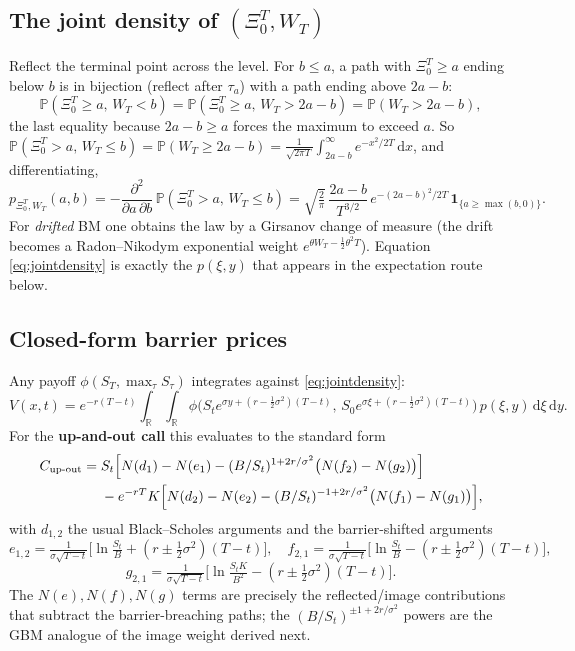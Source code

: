 \documentclass[11pt]{article}
\newcommand{\R}{\mathbb{R}}
\newcommand{\Prob}{\mathbb{P}}
\newcommand{\dd}{\,\mathrm{d}}
\newcommand{\Max}{\Xi}
\begin{document}
\subsection{The joint density of $(\Max_0^T,W_T)$}\label{sec:joint}
Reflect the terminal point across the level. For $b\le a$, a path with $\Max_0^T\ge a$ ending below $b$ is in
bijection (reflect after $\tau_a$) with a path ending above $2a-b$:
\begin{equation}
\Prob(\Max_0^T\ge a,\,W_T< b)=\Prob(\Max_0^T\ge a,\,W_T>2a-b)=\Prob(W_T>2a-b),
\end{equation}
the last equality because $2a-b\ge a$ forces the maximum to exceed $a$. So
$\Prob(\Max_0^T> a,\,W_T\le b)=\Prob(W_T\ge 2a-b)=\frac{1}{\sqrt{2\pi T}}\int_{2a-b}^{\infty}e^{-x^2/2T}\dd x$,
and differentiating,
\begin{equation}\label{eq:jointdensity}
p_{\Max_0^T,W_T}(a,b)=-\frac{\partial^2}{\partial a\,\partial b}\,\Prob(\Max_0^T>a,\,W_T\le b)
=\sqrt{\tfrac{2}{\pi}}\,\frac{2a-b}{T^{3/2}}\,e^{-(2a-b)^2/2T}\,\mathbf 1_{\{a\ge\max(b,0)\}}.
\end{equation}
For \emph{drifted} BM one obtains the law by a Girsanov change of measure (the drift becomes a Radon--Nikodym
exponential weight $e^{\theta W_T-\frac12\theta^2 T}$). Equation \eqref{eq:jointdensity} is exactly the
$p(\xi,y)$ that appears in the expectation route below.

\subsection{Closed-form barrier prices}
Any payoff $\phi(S_T,\max_{\tau}S_\tau)$ integrates against \eqref{eq:jointdensity}:
\begin{equation}
V(x,t)=e^{-r(T-t)}\!\int_{\R}\!\int_{\R}
\phi\big(S_t e^{\sigma y+(r-\frac12\sigma^2)(T-t)},\,S_0 e^{\sigma\xi+(r-\frac12\sigma^2)(T-t)}\big)\,
p(\xi,y)\dd\xi\dd y .
\end{equation}
For the \textbf{up-and-out call} this evaluates to the standard form
\begin{align}
C_{\text{up-out}}=\;&S_t\Big[N(d_1)-N(e_1)-(B/S_t)^{1+2r/\sigma^2}\big(N(f_2)-N(g_2)\big)\Big]\notag\\
&-e^{-rT}K\Big[N(d_2)-N(e_2)-(B/S_t)^{-1+2r/\sigma^2}\big(N(f_1)-N(g_1)\big)\Big],
\end{align}
with $d_{1,2}$ the usual Black--Scholes arguments and the barrier-shifted arguments
\[
e_{1,2}=\tfrac{1}{\sigma\sqrt{T-t}}\big[\ln\tfrac{S_t}{B}+(r\pm\tfrac12\sigma^2)(T-t)\big],\quad
f_{2,1}=\tfrac{1}{\sigma\sqrt{T-t}}\big[\ln\tfrac{S_t}{B}-(r\pm\tfrac12\sigma^2)(T-t)\big],
\]
\[
g_{2,1}=\tfrac{1}{\sigma\sqrt{T-t}}\big[\ln\tfrac{S_tK}{B^2}-(r\pm\tfrac12\sigma^2)(T-t)\big].
\]
The $N(e),N(f),N(g)$ terms are precisely the reflected/image contributions that subtract the
barrier-breaching paths; the $(B/S_t)^{\pm 1+2r/\sigma^2}$ powers are the GBM analogue of the image weight
derived next.
\end{document}
